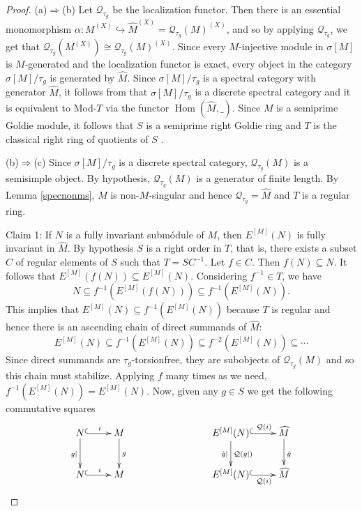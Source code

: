 \documentclass{amsart}
\theoremstyle{definition}
\theoremstyle{remark}
\numberwithin{equation}{section}
\DeclareMathOperator{\Hom}{Hom}
\newcommand{\sm}{\sigma[M]}
\begin{document}
	\begin{proof}
		(a)$\Rightarrow$(b) 
		Let $\mathcal{Q}_{\tau_g}$ be the localization functor. 
		Then there is an essential monomorphism 
		$\alpha:M^{(X)}\hookrightarrow \widehat{M}^{(X)}
		=\mathcal{Q}_{\tau_g}(M)^{(X)}$, 
		and so by applying $\mathcal{Q}_{\tau_g}$, we get that 
		$\mathcal{Q}_{\tau_g}(M^{(X)})\cong\mathcal{Q}_{\tau_g}(M)^{(X)}$.  
		Since every $M$-injective module in $\sm$ is $M$-generated 
		and the localization functor is exact, 
		every object in the category $\sm/\tau_g$ is generated by $\widehat{M}$. 
		Since $\sm/\tau_g$ is a spectral category with generator $\widehat{M}$, 
		it follows from \cite[Ch. XII, Theorem 1.3 and Theorem 1.4]{stenstromrings} 
		that $\sm/\tau_g$ is a discrete spectral category and it is equivalent to Mod-$T$ via the functor $\Hom(\widehat{M},\_)$. 
		Since $M$ is a semiprime Goldie module, 
		it follows that $S$ is a semiprime right Goldie ring and 
		$T$ is the classical right ring of quotients 
		of $S$ \cite[Theorem 2.22]{maugoldie}. 
		
		(b)$\Rightarrow$(c) Since $\sm/\tau_g$ is a discrete spectral category, $\mathcal{Q}_{\tau_g}(M)$ is a semisimple object. By hypothesis, $\mathcal{Q}_{\tau_g}(M)$ is a generator of finite length. By Lemma \ref{specnonms}, $M$ is non-$M$-singular and hence $\mathcal{Q}_{\tau_g}=\widehat{M}$ and $T$ is a regular ring.
		
		Claim 1: If $N$ is a fully invariant submódule of $M$, then $E^{[M]}(N)$ is fully invariant in $\widehat{M}$. By hypothesis $S$ is a right order in $T$, that is, there exists a subset $C$ of regular elements of $S$ such that $T=SC^{-1}$. Let $f\in C$. Then $f(N)\subseteq N$. It follows that $E^{[M]}(f(N))\subseteq E^{[M]}(N)$. Considering $f^{-1}\in T$, we have 
		\[N\subseteq f^{-1}\left( E^{[M]}(f(N))\right)\subseteq f^{-1}\left( E^{[M]}(N)\right).\]
		This implies that $E^{[M]}(N)\subseteq f^{-1}\left( E^{[M]}(N)\right)$ because $T$ is regular and hence there is an ascending chain of direct summands of $\widehat{M}$:
		\[E^{[M]}(N)\subseteq f^{-1}\left( E^{[M]}(N)\right)\subseteq f^{-2}\left( E^{[M]}(N)\right)\subseteq\cdots\]
		Since direct summands are $\tau_g$-torsionfree, they are subobjects of $\mathcal{Q}_{\tau_g}(M)$ and so this chain must stabilize. Applying $f$ many times as we need,  $f^{-1}\left(E^{[M]}(N)\right)=E^{[M]}(N)$. Now, given any $g\in S$ we get the following commutative squares
		\[\xymatrix{N\ar@{^(-{>}}[r]^i \ar[d]_{g|} & M \ar[d]^g & & & E^{[M]}(N)\ar@{^(-{>}}[r]^-{\mathcal{Q}(i)} \ar[d]_{\hat{g}|}^{\mathcal{Q}(g|)} & \widehat{M} \ar[d]^{\hat{g}} \\
			N\ar@{^(-{>}}[r]^i & M & & & E^{[M]}(N)\ar@{^(-{>}}[r]_-{\mathcal{Q}(i)} & \widehat{M}}\]
		

\end{proof}
\end{document}
